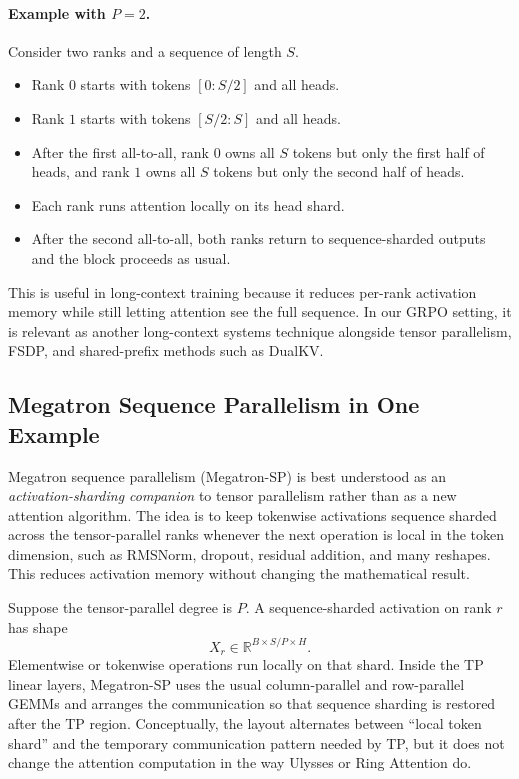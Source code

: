 \documentclass[11pt]{article}
\begin{document}
\paragraph{Example with $P=2$.}
Consider two ranks and a sequence of length $S$.
\begin{itemize}
    \item Rank $0$ starts with tokens $[0 : S/2]$ and all heads.
    \item Rank $1$ starts with tokens $[S/2 : S]$ and all heads.
    \item After the first all-to-all, rank $0$ owns all $S$ tokens but only the
    first half of heads, and rank $1$ owns all $S$ tokens but only the second
    half of heads.
    \item Each rank runs attention locally on its head shard.
    \item After the second all-to-all, both ranks return to sequence-sharded
    outputs and the block proceeds as usual.
\end{itemize}

This is useful in long-context training because it reduces per-rank activation
memory while still letting attention see the full sequence. In our GRPO setting,
it is relevant as another long-context systems technique alongside tensor
parallelism, FSDP, and shared-prefix methods such as DualKV.

\subsection{Megatron Sequence Parallelism in One Example}

Megatron sequence parallelism (Megatron-SP) is best understood as an
\emph{activation-sharding companion} to tensor parallelism rather than as a new
attention algorithm. The idea is to keep tokenwise activations sequence sharded
across the tensor-parallel ranks whenever the next operation is local in the
token dimension, such as RMSNorm, dropout, residual addition, and many reshapes.
This reduces activation memory without changing the mathematical result.

Suppose the tensor-parallel degree is $P$. A sequence-sharded activation on rank
$r$ has shape
\[
X_r \in \mathbb{R}^{B \times S/P \times H}.
\]
Elementwise or tokenwise operations run locally on that shard. Inside the TP
linear layers, Megatron-SP uses the usual column-parallel and row-parallel GEMMs
and arranges the communication so that sequence sharding is restored after the
TP region. Conceptually, the layout alternates between ``local token shard'' and
the temporary communication pattern needed by TP, but it does not change the
attention computation in the way Ulysses or Ring Attention do.
\end{document}
